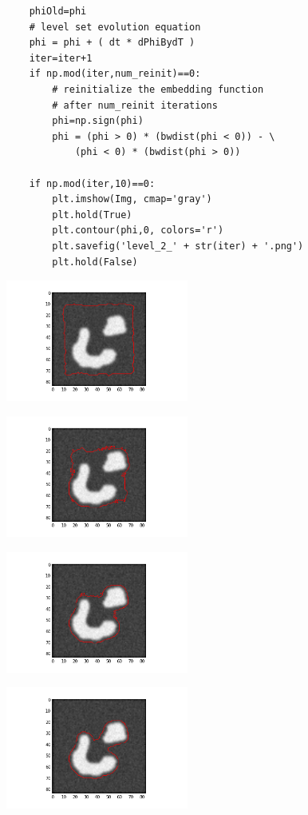 \documentclass[12pt,fleqn]{article}\usepackage{../common}
\begin{document}
\begin{verbatim}
    phiOld=phi
    # level set evolution equation    
    phi = phi + ( dt * dPhiBydT )
    iter=iter+1
    if np.mod(iter,num_reinit)==0:
        # reinitialize the embedding function 
        # after num_reinit iterations
        phi=np.sign(phi)
        phi = (phi > 0) * (bwdist(phi < 0)) - \
            (phi < 0) * (bwdist(phi > 0))
        
    if np.mod(iter,10)==0:
        plt.imshow(Img, cmap='gray')
        plt.hold(True)
        plt.contour(phi,0, colors='r')
        plt.savefig('level_2_' + str(iter) + '.png')
        plt.hold(False)
\end{verbatim}

\includegraphics[height=4cm]{level_2_10.png}

\includegraphics[height=4cm]{level_2_20.png}

\includegraphics[height=4cm]{level_2_30.png}

\includegraphics[height=4cm]{level_2_40.png}
\end{document}

